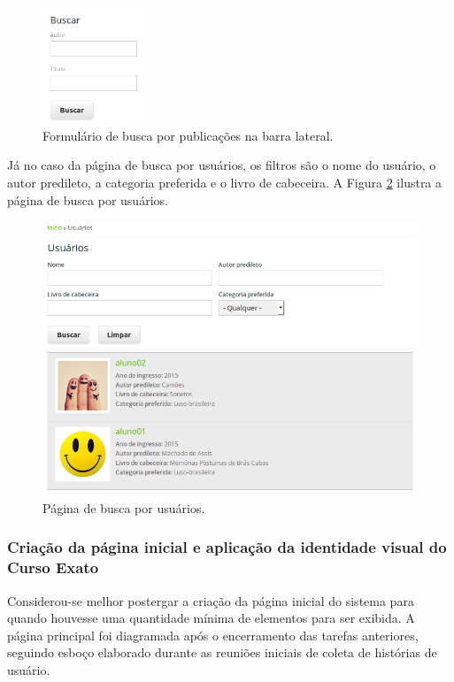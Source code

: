 \documentclass[a4paper]{article}
\begin{document}
\begin{figure}[pbth!]
\centering
\caption{Formulário de busca por publicações na barra lateral.\label{browse-sidebar}}
\includegraphics[width=30mm]{img/browse-sidebar.png}
\end{figure}

Já no caso da página de busca por usuários, os filtros são o nome do usuário, o autor predileto, a categoria preferida e o livro de cabeceira. A Figura \ref{users} ilustra a página de busca por usuários.

\begin{figure}[pbth!]
\centering
\caption{Página de busca por usuários.\label{users}}
\includegraphics[width=120mm]{img/users.png}
\end{figure}


\subsubsection{Criação da página inicial e aplicação da identidade visual do Curso Exato}

Considerou-se melhor postergar a criação da página inicial do sistema para quando houvesse uma quantidade mínima de elementos para ser exibida. A página principal foi diagramada após o encerramento das tarefas anteriores, seguindo esboço elaborado durante as reuniões iniciais de coleta de histórias de usuário.
\end{document}
